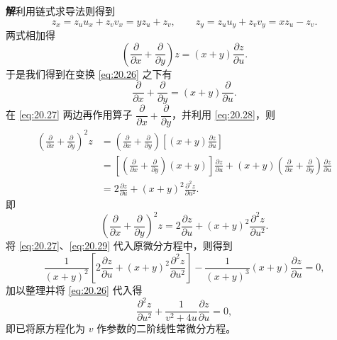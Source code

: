 \begin{xsolution}
\textbf{解}\quad 利用链式求导法则得到
\[
  z_x=z_uu_x+z_vv_x=yz_u+z_v,
  \qquad
  z_y=z_uu_y+z_vv_y=xz_u-z_v.
\]
两式相加得
\begin{equation}
  \left(\frac\partial{\partial x}+\frac\partial{\partial y}\right)z
  =(x+y)\frac{\partial z}{\partial u}.
  \tag{20.27}
  \label{eq:20.27}
\end{equation}
于是我们得到在变换 \eqref{eq:20.26} 之下有
\begin{equation}
  \frac\partial{\partial x}+\frac\partial{\partial y}
  =(x+y)\frac\partial{\partial u}.
  \tag{20.28}
  \label{eq:20.28}
\end{equation}
在 \eqref{eq:20.27} 两边再作用算子 $\dfrac\partial{\partial x}+\dfrac\partial{\partial y}$，并利用 \eqref{eq:20.28}，则
\begin{align*}
  \left(\frac\partial{\partial x}+\frac\partial{\partial y}\right)^2z
  &=\left(\frac\partial{\partial x}+\frac\partial{\partial y}\right)
    \left[(x+y)\frac{\partial z}{\partial u}\right]\\
  &=\left[\left(\frac\partial{\partial x}+\frac\partial{\partial y}\right)(x+y)\right]
    \frac{\partial z}{\partial u}
    +(x+y)\left(\frac\partial{\partial x}+\frac\partial{\partial y}\right)
    \frac{\partial z}{\partial u}\\
  &=2\frac{\partial z}{\partial u}+(x+y)^2\frac{\partial^2z}{\partial u^2}.
\end{align*}
即
\begin{equation}
  \left(\frac\partial{\partial x}+\frac\partial{\partial y}\right)^2z
  =2\frac{\partial z}{\partial u}+(x+y)^2\frac{\partial^2z}{\partial u^2}.
  \tag{20.29}
  \label{eq:20.29}
\end{equation}
将 \eqref{eq:20.27}、\eqref{eq:20.29} 代入原微分方程中，则得到
\[
  \frac1{(x+y)^2}\left[2\frac{\partial z}{\partial u}+(x+y)^2\frac{\partial^2z}{\partial u^2}\right]
  -\frac1{(x+y)^3}(x+y)\frac{\partial z}{\partial u}=0,
\]
加以整理并将 \eqref{eq:20.26} 代入得
\[
  \frac{\partial^2z}{\partial u^2}
  +\frac1{v^2+4u}\frac{\partial z}{\partial u}=0,
\]
即已将原方程化为 $v$ 作参数的二阶线性常微分方程。
\end{xsolution}

